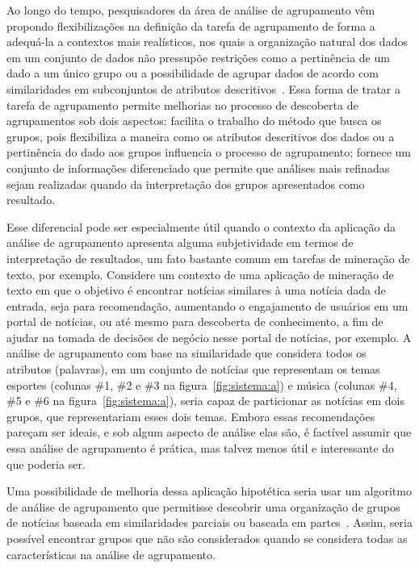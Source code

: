 \documentclass[
    12pt,                %
    oneside,            %
    a4paper,            %
    english,            %
    brazil                %
    ]{abntex2ppgsi}
\begin{document}
Ao longo do tempo, pesquisadores da área de análise de agrupamento vêm propondo flexibilizações na definição da tarefa de agrupamento de forma a adequá-la a contextos mais realísticos, nos quais a organização natural dos dados em um conjunto de dados não pressupõe restrições como a pertinência de um dado a um único grupo ou a possibilidade de agrupar dados de acordo com similaridades em subconjuntos de atributos descritivos~\cite{Bezdek1981,Han2011,Peres2012}.
Essa forma de tratar a tarefa de agrupamento permite melhorias no processo de descoberta de agrupamentos sob dois aspectos: facilita o trabalho do método que busca os grupos, pois flexibiliza a maneira como os atributos descritivos dos dados ou a pertinência do dado aos grupos influencia o processo de agrupamento; fornece um conjunto de informações diferenciado que permite que análises mais refinadas sejam realizadas quando da interpretação dos grupos apresentados como resultado.

Esse diferencial pode ser especialmente útil quando o contexto da aplicação da análise de agrupamento apresenta alguma subjetividade em termos de interpretação de resultados, um fato bastante comum em tarefas de mineração de texto, por exemplo.
Considere um contexto de uma aplicação de mineração de texto em que o objetivo é encontrar notícias similares à uma notícia dada de entrada, seja para recomendação, aumentando o engajamento de usuários em um portal de notícias, ou até mesmo para descoberta de conhecimento, a fim de ajudar na tomada de decisões de negócio nesse portal de notícias, por exemplo.
A análise de agrupamento com base na similaridade que considera todos os atributos (palavras), em um conjunto de notícias que representam os temas esportes (colunas \#1, \#2 e \#3 na figura~\ref{fig:sistema:a}) e música (colunas \#4, \#5 e \#6 na figura~\ref{fig:sistema:a}), seria capaz de particionar as notícias em dois grupos, que representariam esses dois temas.
Embora essas recomendações pareçam ser ideais, e sob algum aspecto de análise elas são, é factível assumir que essa análise de agrupamento é prática, mas talvez menos útil e interessante do que poderia ser.

Uma possibilidade de melhoria dessa aplicação hipotética seria usar um algoritmo de análise de agrupamento que permitisse descobrir uma organização de grupos de notícias baseada em similaridades parciais ou baseada em partes~\cite{Franca2010,Ho2008}.
Assim, seria possível encontrar grupos que não são considerados quando se considera todas as características na análise de agrupamento.
\end{document}
